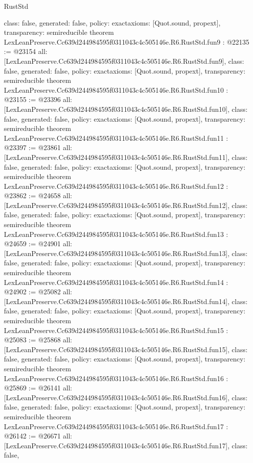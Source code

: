 \begin{lexlean}{RustStd}
\begin{coremodule}
{  class: false,
  generated: false,
  policy: exact{axioms: [Quot.sound, propext]},
  transparency: semireducible
}
theorem LexLeanPreserve.Cc639d244984595f0311043c4c505146e.R6.RustStd.fun9 : @22135 := @23154 {
  all: [LexLeanPreserve.Cc639d244984595f0311043c4c505146e.R6.RustStd.fun9],
  class: false,
  generated: false,
  policy: exact{axioms: [Quot.sound, propext]},
  transparency: semireducible
}
theorem LexLeanPreserve.Cc639d244984595f0311043c4c505146e.R6.RustStd.fun10 : @23155 := @23396 {
  all: [LexLeanPreserve.Cc639d244984595f0311043c4c505146e.R6.RustStd.fun10],
  class: false,
  generated: false,
  policy: exact{axioms: [Quot.sound, propext]},
  transparency: semireducible
}
theorem LexLeanPreserve.Cc639d244984595f0311043c4c505146e.R6.RustStd.fun11 : @23397 := @23861 {
  all: [LexLeanPreserve.Cc639d244984595f0311043c4c505146e.R6.RustStd.fun11],
  class: false,
  generated: false,
  policy: exact{axioms: [Quot.sound, propext]},
  transparency: semireducible
}
theorem LexLeanPreserve.Cc639d244984595f0311043c4c505146e.R6.RustStd.fun12 : @23862 := @24658 {
  all: [LexLeanPreserve.Cc639d244984595f0311043c4c505146e.R6.RustStd.fun12],
  class: false,
  generated: false,
  policy: exact{axioms: [Quot.sound, propext]},
  transparency: semireducible
}
theorem LexLeanPreserve.Cc639d244984595f0311043c4c505146e.R6.RustStd.fun13 : @24659 := @24901 {
  all: [LexLeanPreserve.Cc639d244984595f0311043c4c505146e.R6.RustStd.fun13],
  class: false,
  generated: false,
  policy: exact{axioms: [Quot.sound, propext]},
  transparency: semireducible
}
theorem LexLeanPreserve.Cc639d244984595f0311043c4c505146e.R6.RustStd.fun14 : @24902 := @25082 {
  all: [LexLeanPreserve.Cc639d244984595f0311043c4c505146e.R6.RustStd.fun14],
  class: false,
  generated: false,
  policy: exact{axioms: [Quot.sound, propext]},
  transparency: semireducible
}
theorem LexLeanPreserve.Cc639d244984595f0311043c4c505146e.R6.RustStd.fun15 : @25083 := @25868 {
  all: [LexLeanPreserve.Cc639d244984595f0311043c4c505146e.R6.RustStd.fun15],
  class: false,
  generated: false,
  policy: exact{axioms: [Quot.sound, propext]},
  transparency: semireducible
}
theorem LexLeanPreserve.Cc639d244984595f0311043c4c505146e.R6.RustStd.fun16 : @25869 := @26141 {
  all: [LexLeanPreserve.Cc639d244984595f0311043c4c505146e.R6.RustStd.fun16],
  class: false,
  generated: false,
  policy: exact{axioms: [Quot.sound, propext]},
  transparency: semireducible
}
theorem LexLeanPreserve.Cc639d244984595f0311043c4c505146e.R6.RustStd.fun17 : @26142 := @26671 {
  all: [LexLeanPreserve.Cc639d244984595f0311043c4c505146e.R6.RustStd.fun17],
  class: false,
}
\end{coremodule}
\end{lexlean}
